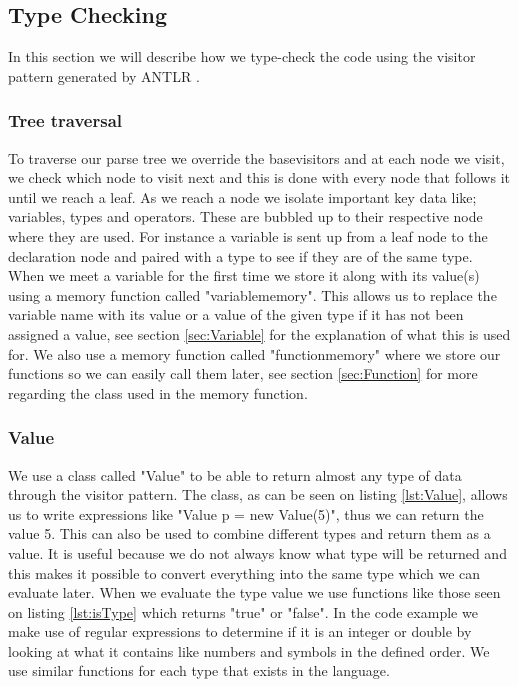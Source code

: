 \subsection{Type Checking}
\label{sec:typecheck}
In this section we will describe how we type-check the code using the visitor pattern generated by ANTLR \citep{ANTLR}.

\subsubsection{Tree traversal}
To traverse our parse tree we override the basevisitors and at each node we visit, we check which node to visit next and this is done with every node that follows it until we reach a leaf. As we reach a node we isolate important key data like; variables, types and operators. These are bubbled up to their respective node where they are used. For instance a variable is sent up from a leaf node to the declaration node and paired with a type to see if they are of the same type.
When we meet a variable for the first time we store it along with its value(s) using a memory function called "variablememory". This allows us to replace the variable name with its value or a value of the given type if it has not been assigned a value, see section \ref{sec:Variable} for the explanation of what this is used for. We also use a memory function called "functionmemory" where we store our functions so we can easily call them later, see section \ref{sec:Function} for more regarding the class used in the memory function.

\subsubsection{Value}
We use a class called "Value" to be able to return almost any type of data through the visitor pattern.
The class, as can be seen on listing \ref{lst:Value}, allows us to write expressions like "Value p = new Value(5)", thus we can return the value 5. This can also be used to combine different types and return them as a value. It is useful because we do not always know what type will be returned and this makes it possible to convert everything into the same type which we can evaluate later.
When we evaluate the type value we use functions like those seen on listing \ref{lst:isType} which returns "true" or "false". In the code example we make use of regular expressions to determine if it is an integer or double by looking at what it contains like numbers and symbols in the defined order. We use similar functions for each type that exists in the language.

